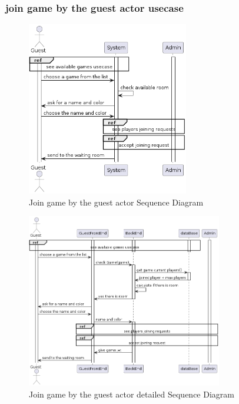 \documentclass{article}
\begin{document}
\subsubsection{join game by the guest actor usecase}
 \begin{figure}[H]
	 \centering
	 \includegraphics[height=3in]{../thesis_tex/assets/diagrams/guest_join_game_SD.png}
	 \caption{Join game by the guest actor Sequence Diagram}
\end{figure}

 \begin{figure}[H]
	 \centering
	 \includegraphics[height=3in]{../thesis_tex/assets/diagrams/guest_join_game_detailedSD.png}
	 \caption{Join game by the guest actor detailed Sequence Diagram}
\end{figure}
\end{document}
